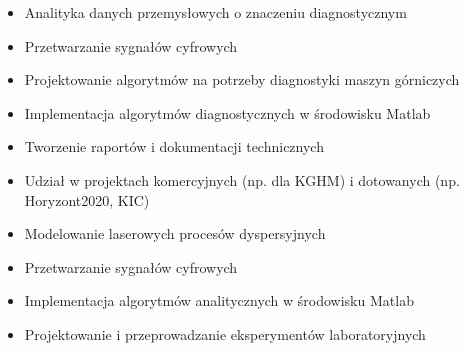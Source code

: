 \documentclass[10pt,a4paper]{altacv}
\begin{document}

\begin{fullwidth}
\makecvheader
\end{fullwidth}




\begin{itemize}
    \item Analityka danych przemysłowych o znaczeniu diagnostycznym
    \item Przetwarzanie sygnałów cyfrowych
    \item Projektowanie algorytmów na potrzeby diagnostyki maszyn górniczych
    \item Implementacja algorytmów diagnostycznych w środowisku Matlab
    \item Tworzenie raportów i dokumentacji technicznych
    \item Udział w projektach komercyjnych (np. dla KGHM) i dotowanych (np. Horyzont2020, KIC)
\end{itemize}

\divider

\begin{itemize}
    \item Modelowanie laserowych procesów dyspersyjnych 
    \item Przetwarzanie sygnałów cyfrowych
    \item Implementacja algorytmów analitycznych w środowisku Matlab
    \item Projektowanie i przeprowadzanie eksperymentów laboratoryjnych
\end{itemize}
\end{document}

